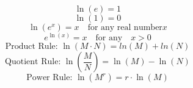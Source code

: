 \begin{tcolorbox}[title = {Review: Logarithmic Properties }]

\begin{equation}
\ln(e) = 1
\end{equation}
\vspace{-0.6cm}
\begin{equation}
\ln(1) = 0
\end{equation}
\vspace{-0.6cm}
\begin{equation}
\ln(e^x) =x \quad \text{for any real number} x
\end{equation}
\vspace{-0.6cm}
\begin{equation}
e^{\ln(x)}=x \quad \text{for any} \quad x>0
\end{equation}
\vspace{-0.6cm}
\begin{equation}
\text{Product Rule: } \ln(M \cdot N)=ln(M) +ln(N)
\end{equation}
\vspace{-0.6cm}
\begin{equation}
\text{Quotient Rule: } \ln\left(\frac{M}{N}\right)=\ln(M) - \ln(N) 
\end{equation}
\vspace{-0.6cm}
\begin{equation}
\text{Power Rule: } \ln(M^r) = r \cdot \ln(M)
\end{equation}

\end{tcolorbox}

